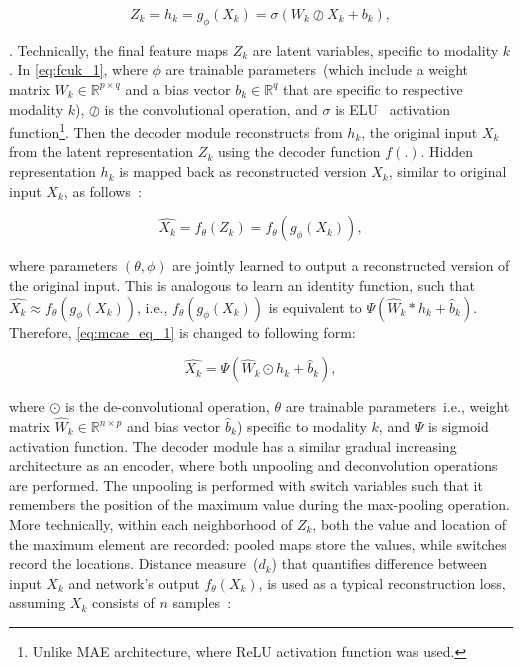 \begin{equation}
    Z_k = h_{k}=g_\phi \left({X}_{k}\right)=\sigma\left(W_{k} \oslash X_{k}+b_{k}\right),
    \label{eq:fcuk_1}
\end{equation}

\hspace*{3.5mm}. Technically, the final feature maps $Z_k$ are latent variables, specific to modality $k$. In \cref{eq:fcuk_1}, where $\phi$ are trainable parameters~(which include a weight matrix $W_{k} \in \mathbb{R}^{p \times q}$ and a bias vector $b_{k} \in \mathbb{R}^{q}$ that are specific to respective modality $k$), $\oslash$ is the convolutional operation, and $\sigma$ is ELU~\cite{clevert2015fast} activation function\footnote{Unlike MAE architecture, where ReLU activation function was used.}. Then the decoder module reconstructs from $h_k$, the original input $X_{k}$ from the latent representation $Z_k$ using the decoder function $f(.)$. Hidden representation $h_{k}$ is mapped back as reconstructed version $\hat{X}_{k}$, similar to original input ${X}_{k}$, as follows~\cite{mmdcae}: 

\begin{equation}
    \hat{X_k}=f_{\theta}\left(Z_k\right)=f_{\theta}\left(g_{\phi}({X_k})\right) \label{eq:mcae_eq_1},
\end{equation}

\hspace*{3.5mm} where parameters $(\theta,\phi)$ are jointly learned to output a reconstructed version of the original input. This is analogous to learn an identity function, such that $\hat{X_k} \approx f_{\theta}\left(g_{\phi}({X_k})\right)$, i.e., $f_{\theta}\left(g_{\phi}({X_k})\right)$ is equivalent to $\Psi \left(\hat W_k * h_k + \hat b_{k}\right)$. Therefore,  \cref{eq:mcae_eq_1} is changed to following form: 

\begin{equation}
    \hat{X_k}=\Psi \left(\hat W_k \odot h_k + \hat b_{k}\right),
\end{equation}

\hspace*{3.5mm} where $\odot$ is the de-convolutional operation, $\theta$ are trainable parameters~i.e., weight matrix $\hat W_{k} \in \mathbb{R}^{n \times p}$ and bias vector $\hat b_{k}$) specific to modality $k$, and $\Psi$ is sigmoid activation function. The decoder module has a similar gradual increasing architecture as an encoder, where both unpooling and deconvolution operations are performed. The unpooling is performed with switch variables such that it remembers the position of the maximum value during the max-pooling operation. More technically, within each neighborhood of $Z_k$, both the value and location of the maximum element are recorded: pooled maps store the values, while switches record the locations. Distance measure~($d_{k}$) that quantifies difference between input $X_{k}$ and network's output $f_\theta(X_{k})$, is used as a typical reconstruction loss, assuming $X_k$ consists of $n$ samples~\cite{KarimIEEEAccess2019}: 

